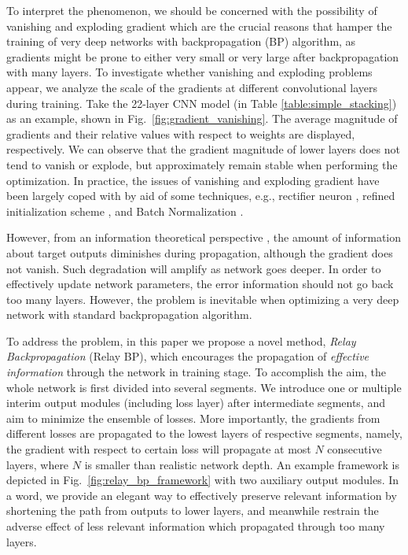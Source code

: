 \documentclass[runningheads]{llncs}
\begin{document}
To interpret the phenomenon, we should be concerned with the possibility of vanishing and exploding gradient which are the crucial reasons that hamper the training of very deep networks with backpropagation \cite{lecun_1998} (BP) algorithm, as gradients might be prone to either very small or very large after backpropagation with many layers. To investigate whether vanishing and exploding problems appear, we analyze the scale of the gradients at different convolutional layers during training. Take the 22-layer CNN model (in Table \ref{table:simple_stacking}) as an example, shown in Fig.~\ref{fig:gradient_vanishing}. The average magnitude of gradients and their relative values with respect to weights are displayed, respectively. We can observe that the gradient magnitude of lower layers does not tend to vanish or explode, but approximately remain stable when performing the optimization. In practice, the issues of vanishing and exploding gradient have been largely coped with by aid of some techniques, e.g., rectifier neuron \cite{nair_icml2010,maas_icml2013}, refined initialization scheme \cite{glorot_icais2010,he_iccv2015}, and Batch Normalization \cite{ioffe_2015}.

However, from an information theoretical perspective \cite{kaminura_2002,cover_2006,tishby_2015}, the amount of information about target outputs diminishes during propagation, although the gradient does not vanish. Such degradation will amplify as network goes deeper. In order to effectively update network parameters, the error information should not go back too many layers. However, the problem is inevitable when optimizing a very deep network with standard backpropagation algorithm.

To address the problem, in this paper we propose a novel method, {\it Relay Backpropagation} (Relay BP), which encourages the propagation of {\it effective information} through the network in training stage. To accomplish the aim, the whole network is first divided into several segments. We introduce one or multiple interim output modules (including loss layer) after intermediate segments, and aim to minimize the ensemble of losses. More importantly, the gradients from different losses are propagated to the lowest layers of respective segments, namely, the gradient with respect to certain loss will propagate at most $N$ consecutive layers, where $N$ is smaller than realistic network depth. An example framework is depicted in Fig.~\ref{fig:relay_bp_framework} with two auxiliary output modules. In a word, we provide an elegant way to effectively preserve relevant information by shortening the path from outputs to lower layers, and meanwhile restrain the adverse effect of less relevant information which propagated through too many layers.
\end{document}
